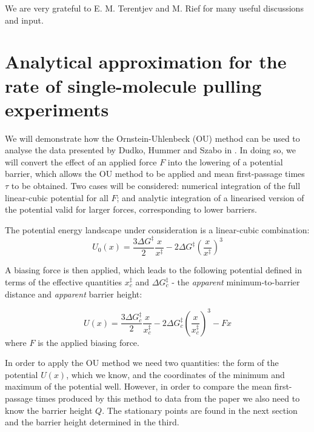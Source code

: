 \documentclass[twocolumn,pre,aps,showpacs,a4paper,floatfix,amssymb]{revtex4-1}
\begin{document}
\begin{acknowledgements}
We are very grateful to E. M. Terentjev and M. Rief for many useful discussions and input.
\end{acknowledgements}

\appendix
\section{Analytical approximation for the rate of single-molecule pulling experiments}
We will demonstrate how the Ornstein-Uhlenbeck (OU) method can be used to analyse the data presented by Dudko, Hummer and Szabo in \cite{dudko2006intrinsic}. In doing so, we will convert the effect of an applied force $F$ into the lowering of a potential barrier, which allows the OU method to be applied and mean first-passage times  $\tau$ to be obtained. Two cases will be considered: numerical integration of the full linear-cubic potential for all $F$; and analytic integration of a linearised version of the potential valid for larger forces, corresponding to lower barriers.

The potential energy landscape under consideration is a linear-cubic combination:
\begin{equation}
U_0(x) = \frac{3\Delta G^\ddagger}{2} \frac{x}{x^\ddagger} - 2\Delta G^\ddagger \left(\frac{x}{x^\ddagger}\right)^3
\end{equation}

\noindent A biasing force is then applied, which leads to the following potential defined in terms of the effective quantities $x_c^\ddagger$ and $\Delta G_c^\ddagger$ -  the \textit{apparent} minimum-to-barrier distance and \textit{apparent} barrier height:

\begin{equation}
U(x) = \frac{3\Delta G_c^\ddagger}{2} \frac{x}{x_c^\ddagger} - 2\Delta G_c^\ddagger \left(\frac{x}{x_c^\ddagger}\right)^3 - Fx
\end{equation}
where $F$ is the applied biasing force. \par


\par
\par \noindent In order to apply the OU method we need two quantities: the form of the potential $U(x)$, which we know, and the coordinates of the minimum and maximum of the potential well. However, in order to compare the mean first-passage times produced by this method to data from the paper we also need to know the barrier height $Q$.  The stationary points are found in the next section and the barrier height determined in the third.
\end{document}

